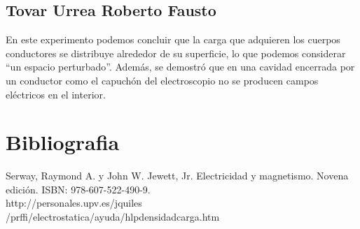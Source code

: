 \documentclass[11pt]{article}
\begin{document}
\begin{multicols}{2}
\subsection{Tovar Urrea Roberto Fausto}
En este experimento podemos concluir que la carga que adquieren los cuerpos conductores se distribuye alrededor de su superficie, lo que podemos considerar “un espacio perturbado”. Además, se demostró que en una cavidad encerrada por un conductor como el capuchón del electroscopio no se producen campos eléctricos en el interior.

\section{Bibliografia}
Serway, Raymond A. y John W. Jewett, Jr. Electricidad y magnetismo. Novena edición. ISBN: 978-607-522-490-9.\\
http://personales.upv.es/jquiles /prffi/electrostatica/ayuda/hlpdensidadcarga.htm

\end{multicols}
\printindex
\end{document}
